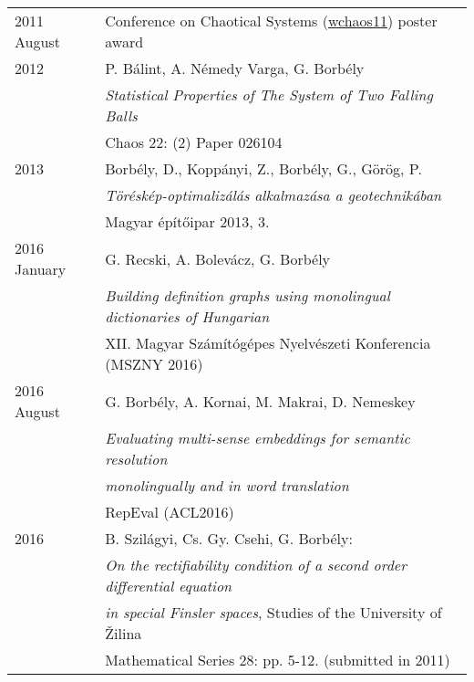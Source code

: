 \documentclass[12pt]{article}
\begin{document}
        \begin{tabular}{p{3cm}l}
	       2011 August & Conference on Chaotical Systems (\href{http://www.mpipks-dresden.mpg.de/~wchaos11/}{wchaos11}) poster award %
		   \\
			2012 & P. Bálint, A. Némedy Varga, G. Borbély\\
                & \emph{Statistical Properties of The System of Two Falling Balls} \\
                & Chaos 22: (2) Paper 026104
			\\
			2013 & Borbély, D., Koppányi, Z., Borbély, G., Görög, P.\\
                & \emph{Töréskép-optimalizálás alkalmazása a geotechnikában} \\
                & Magyar építőipar 2013, 3.
            \\
            2016 January & G. Recski, A. Bolevácz, G. Borbély \\
                & \emph{Building definition graphs using monolingual dictionaries of Hungarian} \\
                & XII. Magyar Számítógépes Nyelvészeti Konferencia (MSZNY 2016)
            \\
            2016 August & G. Borbély, A. Kornai, M. Makrai, D. Nemeskey \\
                & \emph{Evaluating multi-sense embeddings for semantic resolution} \\
                & \emph{monolingually and in word translation} \\
                & RepEval (ACL2016)\\
            2016 & B. Szilágyi, Cs. Gy. Csehi, G. Borbély:\\
                & \emph{On the rectifiability condition of a second order differential equation}\\
                & \emph{in special Finsler spaces}, Studies of the University of Žilina \\
                & Mathematical Series 28: pp. 5-12. (submitted in 2011)\\
       \end{tabular}
 \vspace{0.3cm}
\end{document}

